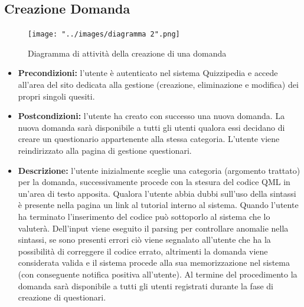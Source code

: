 \rigaregistro{0.0.17}{Luca Alessio (Progettista)}{12/05/2016}{Termine stesura sezione diagrammi e revisione/ampliamento di vari paragrafi}\documentclass[a4paper,11pt]{article}
\begin{document}
\subsection{Creazione Domanda}
\begin{figure}[h!]
\begin{center}
	\centerline{\texttt{[image: "../images/diagramma 2".png]}}
	\caption{Diagramma di attività della creazione di una domanda}
\end{center}
\end{figure}
\begin{itemize}
\item\textbf{Precondizioni:} l'utente è autenticato nel sistema Quizzipedia e accede all'area del sito dedicata alla gestione (creazione, eliminazione e modifica) dei propri singoli quesiti.
\item\textbf{Postcondizioni:} l'utente ha creato con successo una nuova domanda. La nuova domanda sarà disponibile a tutti gli utenti qualora essi decidano di creare un questionario appartenente alla stessa categoria. L'utente viene reindirizzato alla pagina di gestione questionari. %
\item\textbf{Descrizione:} l'utente inizialmente sceglie una categoria (argomento trattato) per la domanda, successivamente procede con la stesura del codice QML in un'area di testo apposita. Qualora l'utente abbia dubbi sull'uso della sintassi è presente nella pagina un link al tutorial interno al sistema. Quando l'utente ha terminato l'inserimento del codice può sottoporlo al sistema che lo valuterà. Dell'input viene eseguito il parsing per controllare anomalie nella sintassi, se sono presenti errori ciò viene segnalato all'utente che ha la possibilità di correggere il codice errato, altrimenti la domanda viene considerata valida e il sistema procede alla sua memorizzazione nel sistema (con conseguente notifica positiva all'utente). Al termine del procedimento la domanda sarà disponibile a tutti gli utenti registrati durante la fase di creazione di questionari.
\end{itemize}
\newpage
\end{document}
